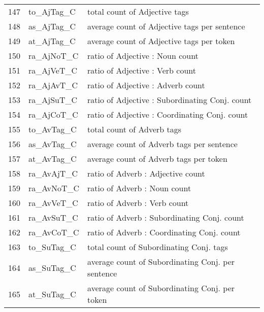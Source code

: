 \documentclass[11pt]{article}
\begin{document}
\begin{table}[H]
{\begin{tabular}{l@{\hspace{0.3ex}}|l@{\hspace{0.3ex}}|l@{\hspace{0.3ex}}}
    147   & to\_AjTag\_C   & total count of Adjective tags                                              \\
    148   & as\_AjTag\_C   & average count of Adjective tags per sentence                               \\
    149   & at\_AjTag\_C   & average count of Adjective tags per token                                  \\
    150   & ra\_AjNoT\_C   & ratio of Adjective : Noun count                                 \\
    151   & ra\_AjVeT\_C   & ratio of Adjective : Verb count                                 \\
    152   & ra\_AjAvT\_C   & ratio of Adjective : Adverb count                               \\
    153   & ra\_AjSuT\_C   & ratio of Adjective : Subordinating Conj. count                \\
    154   & ra\_AjCoT\_C   & ratio of Adjective : Coordinating Conj. count                 \\
    155   & to\_AvTag\_C   & total count of Adverb tags                                                 \\
    156   & as\_AvTag\_C   & average count of Adverb tags per sentence                                  \\
    157   & at\_AvTag\_C   & average count of Adverb tags per token                                     \\
    158   & ra\_AvAjT\_C   & ratio of Adverb : Adjective count                               \\
    159   & ra\_AvNoT\_C   & ratio of Adverb : Noun count                                    \\
    160   & ra\_AvVeT\_C   & ratio of Adverb : Verb count                                    \\
    161   & ra\_AvSuT\_C   & ratio of Adverb : Subordinating Conj. count                   \\
    162   & ra\_AvCoT\_C   & ratio of Adverb : Coordinating Conj. count                    \\
    163   & to\_SuTag\_C   & total count of Subordinating Conj. tags                              \\
    164   & as\_SuTag\_C   & average count of Subordinating Conj. per sentence               \\
    165   & at\_SuTag\_C   & average count of Subordinating Conj. per token                  \\

\end{tabular}}
\end{table}
\end{document}
